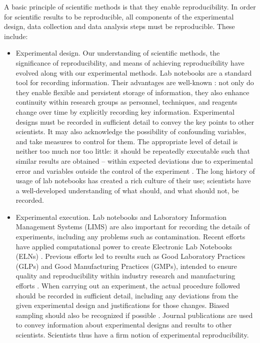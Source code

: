 A basic principle of scientific methods is that they enable reproducibility.  
In order for scientific results to be reproducible, all components of the 
experimental design, data collection and data analysis steps must be 
reproducible.  These include:
\begin{itemize}

  \item Experimental design.  Our understanding of scientific methods, the 
  significance of reproducibility, and means of achieving reproducibility 
  have evolved along with our experimental methods.  
  Lab notebooks are a standard tool for recording information.  Their 
  advantages are well-known \cite{rubacha2011eln}: not only do they enable 
  flexible and persistent storage of information, they also enhance 
  continuity within research groups as personnel, techniques, 
  and reagents change over time by explicitly recording key information.
  Experimental designs must be recorded in sufficient detail to convey the key
  points to other scientists.  It may also acknowledge the possibility of 
  confounding variables, and take measures to control for them.
  The appropriate level of detail is neither too much nor too little:
  it should be repeatedly executable such that similar results are obtained 
  -- within expected deviations due to experimental error and variables 
  outside the control of the experiment \cite{drummond2012reproducible}.
  The long history of usage of lab notebooks has created a rich culture of
  their use; scientists have a well-developed understanding of what should,
  and what should not, be recorded.

  \item Experimental execution.  Lab notebooks and 
  Laboratory Information Management Systems (LIMS) 
  are also important for recording the details of experiments, including 
  any problems such as contamination.  Recent efforts have applied 
  computational power to create Electronic Lab Notebooks (ELNs)
  \cite{talbott2005eln, rubacha2011eln, myers2001eln}.
  Previous efforts led to results such as Good Laboratory Practices (GLPs) and
  Good Manufacturing Practices (GMPs), intended to ensure quality and
  reproducibility within industry research and manufacturing efforts
  \cite{macleod2008reprint, unger2008good}.
  When carrying out an experiment, the actual procedure followed should be
  recorded in sufficient detail, including any deviations from the given 
  experimental design and justifications for those changes.
  Biased sampling should also be recognized if possible
  \cite{savovic2012influence, simmons2011false}.
  Journal publications are used to convey information about experimental
  designs and results to other scientists.  Scientists thus have a firm
  notion of experimental reproducibility.


\end{itemize}
